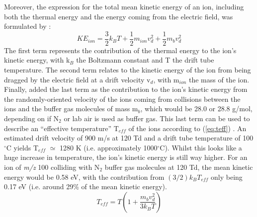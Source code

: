
Moreover, the expression for the total mean kinetic  energy of an ion, including both the thermal energy and the energy coming from the electric field, was formulated by \citeauthor{wannier1951bell} \cite{wannier1951bell,wannier1952motion}: %
\begin{equation}
    \label{eq:KEions}
    KE_{ion} = \frac{3}{2}k_B T + \frac{1}{2}m_{ion} v_d^2 + \frac{1}{2}m_b v_d^2
\end{equation}
The first term represents the contribution of the thermal energy to the ion's kinetic energy, with k$_B$ the Boltzmann constant and T  the drift tube temperature.
The second term relates to the kinetic energy of the ion from being dragged by the electric field at a drift velocity v$_d$, with m$_{ion}$ the mass of the ion.
Finally, \citeauthor{wannier1951bell} added the last term as the contribution to the ion's kinetic energy  from the randomly-oriented velocity of the ions coming from collisions between the ions and the buffer gas molecules of mass m$_b$, which would be 28.0 or 28.8 g/mol, depending on if N$_2$ or lab air is used as buffer gas.
%
This last term can be used to describe an ``effective temperature'' T$_{eff}$ of the ions according to 
\citeauthor{revercomb1975theory} (\autoref{eq:teff})
\cite{revercomb1975theory}.
%
An estimated drift velocity of 900 m/s at 120 Td and a drift tube temperature of 100$^{\circ}$C yields T$_{eff}$ $\simeq$ 1280 K (i.e. approximately 1000$^{\circ}$C).
%
Whilst this looks like a huge increase in temperature, the ion’s kinetic energy is still way higher.
%
For an ion of \textit{m/z} 100 colliding with N$_2$ buffer gas molecules at 120 Td, the mean kinetic energy would be 0.58 eV, with the contribution from $(3/2)k_{B}T_{eff}$  only being 0.17 eV (i.e. around 29\% of the mean kinetic energy).
%
\begin{equation}
    T_{eff} = T\left(1 + \frac{m_b v_d^2}{3 k_B T}\right)
    \label{eq:teff}
\end{equation}


